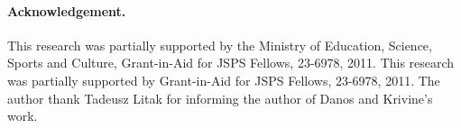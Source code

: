 \documentclass[doctor]{iscs-thesis}
\date{\fix{XXX}}
\begin{document}


\maketitle



\frontmatter
\tableofcontents

\listoffigures

\mainmatter














\paragraph{Acknowledgement.}
This research was partially supported by the Ministry of Education,
Science, Sports and Culture, Grant-in-Aid for JSPS Fellows, 23-6978, 2011.
This research was partially supported by
Grant-in-Aid for JSPS Fellows, 23-6978, 2011.
The author thank Tadeusz Litak for informing the author of
Danos and Krivine's work.

\appendix



\end{document}
